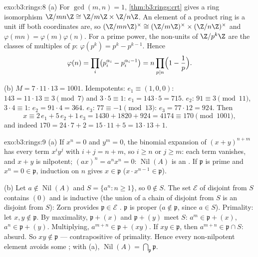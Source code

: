 \begin{solution}{exo:b3:rings:8}
(a) For $\gcd(m, n) = 1$, \cref{thm:b3:rings:crt} gives a ring
isomorphism $\Z/mn\Z \cong \Z/m\Z \times \Z/n\Z$. An element of a
product ring is a unit iff both coordinates are, so
$(\Z/mn\Z)^\times \cong (\Z/m\Z)^\times \times (\Z/n\Z)^\times$
and $\varphi(mn) = \varphi(m)\varphi(n)$. For a prime power, the
non-units of $\Z/p^k\Z$ are the classes of multiples of $p$:
$\varphi(p^k) = p^k - p^{k-1}$. Hence
\[
\varphi(n) = \prod_i \bigl(p_i^{\alpha_i} -
p_i^{\alpha_i-1}\bigr) = n \prod_{p \mid n}\Bigl(1 -
\frac1p\Bigr).
\]

(b) $M = 7 \cdot 11 \cdot 13 = 1001$. Idempotents: $e_1 \equiv
(1, 0, 0)$: $143 = 11\cdot13 \equiv 3 \pmod 7$ and $3 \cdot 5
\equiv 1$: $e_1 = 143 \cdot 5 = 715$. $e_2$: $91 \equiv 3
\pmod{11}$, $3 \cdot 4 \equiv 1$: $e_2 = 91\cdot4 = 364$. $e_3$:
$77 \equiv -1 \pmod{13}$: $e_3 = 77 \cdot 12 = 924$. Then
\[
x \equiv 2\,e_1 + 5\,e_2 + 1\,e_3 = 1430 + 1820 + 924 = 4174
\equiv 170 \pmod{1001},
\]
and indeed $170 = 24\cdot7 + 2 = 15\cdot11 + 5 = 13\cdot13 + 1$.
\end{solution}

\begin{solution}{exo:b3:rings:9}
(a) If $x^n = 0$ and $y^m = 0$, the binomial expansion of
$(x+y)^{n+m}$ has every term $x^iy^j$ with $i + j = n + m$, so $i
\geq n$ or $j \geq m$: each term vanishes, and $x + y$ is
nilpotent; $(ax)^n = a^nx^n = 0$: $\operatorname{Nil}(A)$ is an
. If $\mathfrak p$ is prime and $x^n = 0 \in \mathfrak p$,
induction on $n$ gives $x \in \mathfrak p$ ($x \cdot x^{n-1} \in
\mathfrak p$).

(b) Let $a \notin \operatorname{Nil}(A)$ and $S = \{a^n : n \geq
1\}$, so $0 \notin S$. The set $\mathcal E$ of  disjoint
from $S$ contains $(0)$ and is inductive (the union of a chain of
 disjoint from $S$ is an  disjoint from $S$): Zorn
provides $\mathfrak p \in \mathcal E$ . $\mathfrak p$ is
proper ($a \notin \mathfrak p$, since $a \in S$). Primality: let
$x, y \notin \mathfrak p$. By maximality, $\mathfrak p + (x)$ and
$\mathfrak p + (y)$ meet $S$: $a^m \in \mathfrak p + (x)$, $a^n
\in \mathfrak p + (y)$. Multiplying, $a^{m+n} \in \mathfrak p +
(xy)$. If $xy \in \mathfrak p$, then $a^{m+n} \in \mathfrak p \cap
S$: absurd. So $xy \notin \mathfrak p$ --- contrapositive of
primality. Hence every non-nilpotent element avoids some ; with (a),
$\operatorname{Nil}(A) = \bigcap_{\mathfrak p} \mathfrak p$.
\end{solution}

